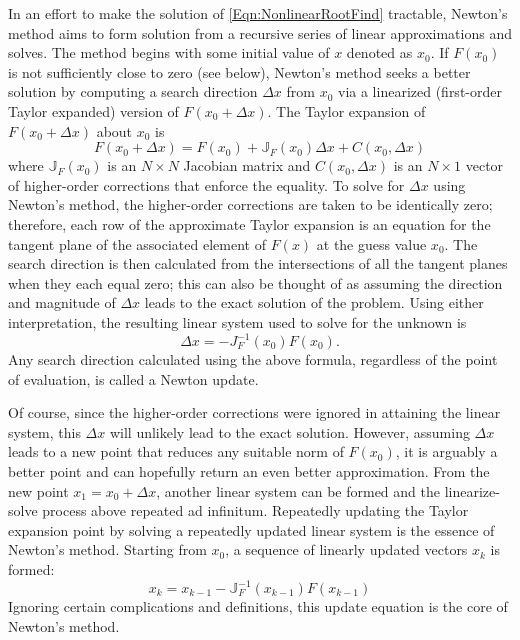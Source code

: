 \documentclass[Prelim,12pt]{WisconsinThesis}
\newcommand{\by}    {\!\times\!}
\begin{document}
In an effort to make the solution of \cref{Eqn:NonlinearRootFind} tractable, Newton's method aims to form solution from a recursive series of linear approximations and solves.
The method begins with some initial value of $x$ denoted as $x_0$.
If $F(x_0)$ is not sufficiently close to zero (see below), Newton's method seeks a better solution by computing a search direction $\Delta{x}$ from $x_0$ via a linearized (first-order Taylor expanded) version of $F(x_0 + \Delta{x})$.
The Taylor expansion of $F(x_0 + \Delta{x})$ about $x_0$ is
\begin{equation}
    F(x_0 + \Delta{x}) =  F(x_0) + \mathbb{J}_{F}(x_0)\Delta{x} + C(x_0,\Delta{x})
\end{equation}
where $\mathbb{J}_{F}(x_0)$ is an $N \by N$ Jacobian matrix and $C(x_0,\Delta{x})$ is an $N \by 1$ vector of higher-order corrections that enforce the equality.
To solve for $\Delta{x}$ using Newton's method, the higher-order corrections are taken to be identically zero; therefore, each row of the approximate Taylor expansion is an equation for the tangent plane of the associated element of $F(x)$ at the guess value $x_0$.
The search direction is then calculated from the intersections of all the tangent planes when they each equal zero; this can also be thought of as assuming the direction and magnitude of $\Delta{x}$ leads to the exact solution of the problem.
Using either interpretation, the resulting linear system used to solve for the unknown is
\begin{equation}
    \Delta{x} = - J_{F}^{-1}(x_0) F(x_0).
\end{equation}
Any search direction calculated using the above formula, regardless of the point of evaluation, is called a Newton update.

Of course, since the higher-order corrections were ignored in attaining the linear system, this $\Delta{x}$ will unlikely lead to the exact solution.
However, assuming $\Delta{x}$ leads to a new point that reduces any suitable norm of $F(x_0)$, it is arguably a better point and can hopefully return an even better approximation.
From the new point $x_1 = x_0 + \Delta{x}$, another linear system can be formed and the linearize-solve process above repeated ad infinitum.
Repeatedly updating the Taylor expansion point by solving a repeatedly updated linear system is the essence of Newton's method.
Starting from $x_0$, a sequence of linearly updated vectors $x_k$ is formed:
\begin{equation}
    x_k = x_{k-1} - \mathbb{J}_{F}^{-1}(x_{k-1}) F(x_{k-1})
\end{equation}
Ignoring certain complications and definitions, this update equation is the core of Newton's method.
\end{document}
